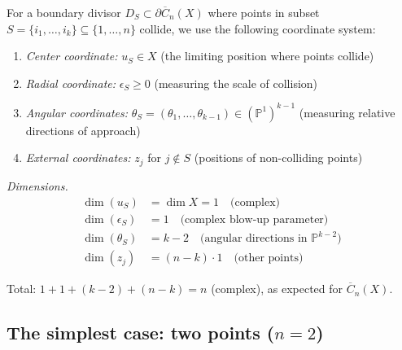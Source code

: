 \begin{convention}\label{conv:coordinate-notation}
For a boundary divisor $D_S \subset \partial\overline{C}_n(X)$ where points in subset
$S = \{i_1, \ldots, i_k\} \subseteq \{1,\ldots,n\}$ collide, we use the following
coordinate system:

\begin{enumerate}
\item \emph{Center coordinate:} $u_S \in X$ (the limiting position where points collide)

\item \emph{Radial coordinate:} $\epsilon_S \geq 0$ (measuring the scale of collision)

\item \emph{Angular coordinates:} $\theta_S = (\theta_1, \ldots, \theta_{k-1}) \in 
(\mathbb{P}^1)^{k-1}$ (measuring relative directions of approach)

\item \emph{External coordinates:} $z_j$ for $j \notin S$ (positions of non-colliding points)
\end{enumerate}

\emph{Dimensions.}
\begin{align*}
\dim(u_S) &= \dim X = 1 \quad \text{(complex)}\\
\dim(\epsilon_S) &= 1 \quad \text{(complex blow-up parameter)}\\
\dim(\theta_S) &= k-2 \quad \text{(angular directions in } \mathbb{P}^{k-2})\\
\dim(z_j) &= (n-k) \cdot 1 \quad \text{(other points)}
\end{align*}

Total: $1 + 1 + (k-2) + (n-k) = n$ (complex), as expected for $\overline{C}_n(X)$.
\end{convention}

\subsection{\texorpdfstring{The simplest case: two points ($n=2$)}{The simplest case: two points (n=2)}}

